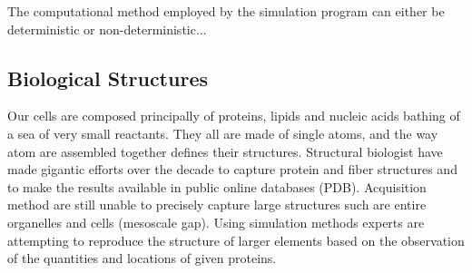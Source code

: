 The computational method employed by the simulation program can either be deterministic or non-deterministic...

%
%
%
%
%
%
%
%
%
%
%
%
%
%
%
%

\subsection{Biological Structures}

Our cells are composed principally of proteins, lipids and nucleic acids bathing of a sea of very small reactants.
They all are made of single atoms, and the way atom are assembled together defines their structures.
Structural biologist have made gigantic efforts over the decade to capture protein and fiber structures and to make the results available in public online databases (PDB).
Acquisition method are still unable to precisely capture large structures such are entire organelles and cells (mesoscale gap).
Using simulation methods experts are attempting to reproduce the structure of larger elements based on the observation of the quantities and locations of given proteins.

